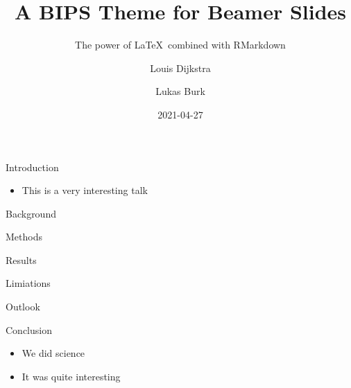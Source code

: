 \documentclass{beamer}
\title{A BIPS Theme for Beamer Slides}
\subtitle{The power of \LaTeX~combined with RMarkdown}
\author{Louis Dijkstra \and Lukas Burk}
\date{2021-04-27}
\providecommand{\tightlist}{%
  \setlength{\itemsep}{0pt}\setlength{\parskip}{0pt}}
\begin{document}
\frame{\maketitle}

\begin{frame}{Introduction}
\protect\hypertarget{introduction}{}
\begin{itemize}[<+->]
\tightlist
\item
  This is a very interesting talk
\end{itemize}
\end{frame}

\begin{frame}{Background}
\protect\hypertarget{background}{}
\end{frame}

\begin{frame}{Methods}
\protect\hypertarget{methods}{}
\end{frame}

\begin{frame}{Results}
\protect\hypertarget{results}{}
\end{frame}

\begin{frame}{Limiations}
\protect\hypertarget{limiations}{}
\end{frame}

\begin{frame}{Outlook}
\protect\hypertarget{outlook}{}
\end{frame}

\begin{frame}{Conclusion}
\protect\hypertarget{conclusion}{}
\begin{itemize}[<+->]
\tightlist
\item
  We did science
\item
  It was quite interesting
\end{itemize}
\end{frame}


\end{document}

